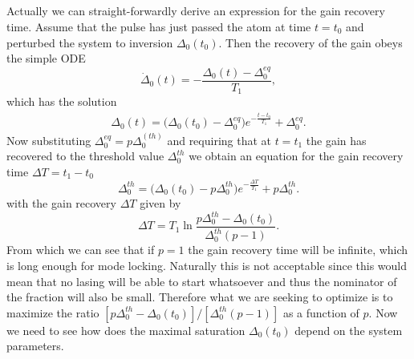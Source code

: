\documentclass[preprint,secnumarabic,amssymb, nobibnotes, aip, prd]{revtex4-1}
\begin{document}
\subsection{}
	Actually we can straight-forwardly derive an expression for the gain recovery time. Assume that the pulse has just passed the atom at time $t=t_0$ and perturbed the system to inversion $\Delta_0(t_0)$. Then the recovery of the gain obeys the simple ODE
	\begin{equation}
	\dot\Delta_0(t) = -\frac{\Delta_0(t) -\Delta_0^{eq}}{T_1},
	\end{equation}    
	which has the solution 
	\begin{eqnarray}
	\Delta_0(t) = \big(\Delta_0(t_0) -\Delta_0^{eq}\big)e^{-\frac{t-t_0}{T_1}}+\Delta_0^{eq}.
	\end{eqnarray}
	Now substituting $\Delta_0^{eq} = p\Delta_0^{(th)}$ and requiring that at $t=t_1$ the gain has recovered to the threshold value $\Delta_0^{th}$ we obtain an equation for the gain recovery time $\Delta T = t_1-t_0$ 
	\begin{equation}
	\Delta_{0}^{th} = \big(\Delta_0(t_0) - p\Delta_0^{th}\big)e^{-\frac{\Delta T}{T_1}}+p\Delta_0^{th}.
	\end{equation}
	with the gain recovery $\Delta T $ given by
	\begin{equation}
	\Delta T = T_1 \ln\frac{p\Delta_0^{th}-\Delta_0(t_0)}{\Delta_0^{th}(p-1)}.
	\end{equation}
	From which we can see that if $p=1$ the gain recovery time will be infinite, which is long enough for mode locking. Naturally this is not acceptable since this would mean that no lasing will be able to start whatsoever and thus the nominator of the fraction will also be small. Therefore what we are seeking to optimize is to maximize the ratio $[p\Delta_0^{th}-\Delta_0(t_0)]/[\Delta_0^{th}(p-1)]$ as a function of $p$. Now we need to see how does the maximal saturation $\Delta_0(t_0)$ depend on the system parameters.
\end{document}
